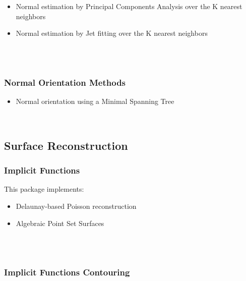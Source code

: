 \begin{itemize}
\item Normal estimation by Principal Components Analysis over the K nearest neighbors
\item Normal estimation by Jet fitting over the K nearest neighbors
\end{itemize}

  \\
  \\


\subsubsection{Normal Orientation Methods}

\begin{itemize}
\item Normal orientation using a Minimal Spanning Tree \cite{cgal:hddms-srup-92}
\end{itemize}

  \\


\subsection{Surface Reconstruction}

\subsubsection{Implicit Functions}

This package implements:

\begin{itemize}
\item Delaunay-based Poisson reconstruction \cite{Kazhdan06}
\item Algebraic Point Set Surfaces \cite{Guennebaud07}
\end{itemize}

  \\
  \\


\subsubsection{Implicit Functions Contouring}

